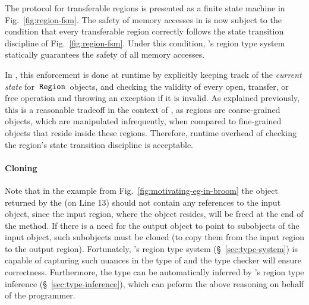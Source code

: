 The protocol for transferable regions is presented as a finite state
machine in Fig.~\ref{fig:region-fsm}.  
%
The safety of memory accesses in \name is now subject to the condition
that every transferable region correctly follows the state transition
discipline of Fig.~\ref{fig:region-fsm}. Under this condition, \name's
region type system statically guarantees the safety of all memory
accesses.

In \name, this enforcement is done at runtime by explicitly keeping
track of the \emph{current state} for $\,{\tt Region}\,$ objects, and checking
the validity of every open, transfer, or free operation and throwing
an exception if it is invalid.  
As explained previously, this is a reasonable tradeoff in the context
of \name, as regions are coarse-grained objects, which are manipulated
infrequently, when compared to fine-grained objects that reside inside
these regions. Therefore, runtime overhead of checking the region's
state transition discipline is acceptable.

\paragraph{Cloning} Note that in the example from
Fig.~\ref{fig:motivating-eg-in-broom} the object returned by the
 (on Line 13) should not contain any references to the
input object, since the input region, where the object resides, will
be freed at the end of the method. If there is a need for the output
object to point to subobjects of the input object, such subobjects
must be cloned (to copy them from the input region to the output
region).  Fortunately, \name's region type system
(\S~\ref{sec:type-system}) is capable of capturing such nuances in the
type of  and the type checker will ensure correctness.
Furthermore, the type can be automatically inferred by \name's region
type inference (\S~\ref{sec:type-inference}), which can peform the
above reasoning on behalf of the programmer.


